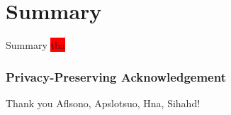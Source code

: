 \section{Summary}
\begin{frame}{Summary}
    \colorbox{red}{tba}
\end{frame}


\begin{frame}
    \frametitle{Privacy-Preserving Acknowledgement}

    \huge
    Thank you Aflsono, Apslotsuo, Hna, Sihahd!
    

\end{frame}